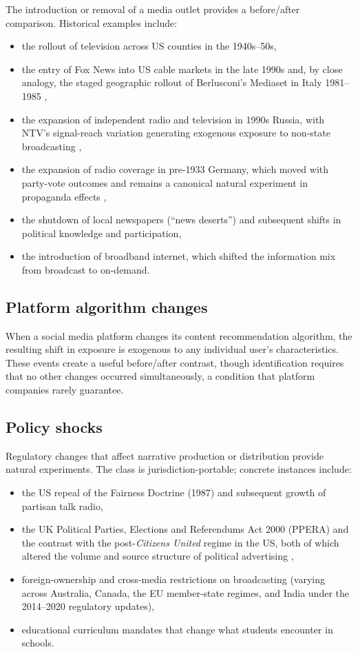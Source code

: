 The introduction or removal of a media outlet provides a before/after comparison.
Historical examples include:
\begin{itemize}[nosep]
  \item the rollout of television across US counties in the 1940s--50s,
  \item the entry of Fox News into US cable markets in the late 1990s \autocite{dellavigna2007} and, by close analogy, the staged geographic rollout of Berlusconi's Mediaset in Italy 1981--1985 \autocite{durante2019},
  \item the expansion of independent radio and television in 1990s Russia, with NTV's signal-reach variation generating exogenous exposure to non-state broadcasting \autocite{enikolopov2011},
  \item the expansion of radio coverage in pre-1933 Germany, which moved with party-vote outcomes and remains a canonical natural experiment in propaganda effects \autocite{adena2015},
  \item the shutdown of local newspapers (``news deserts'') and subsequent shifts in political knowledge and participation,
  \item the introduction of broadband internet, which shifted the information mix from broadcast to on-demand.
\end{itemize}

\subsection{Platform algorithm changes}

When a social media platform changes its content recommendation algorithm, the resulting shift in exposure is exogenous to any individual user's characteristics.
These events create a useful before/after contrast, though identification requires that no other changes occurred simultaneously, a condition that platform companies rarely guarantee.

\subsection{Policy shocks}

Regulatory changes that affect narrative production or distribution provide natural experiments. The class is jurisdiction-portable; concrete instances include:
\begin{itemize}[nosep]
  \item the US repeal of the Fairness Doctrine (1987) and subsequent growth of partisan talk radio,
  \item the UK Political Parties, Elections and Referendums Act 2000 (PPERA) and the contrast with the post-\emph{Citizens United} regime in the US, both of which altered the volume and source structure of political advertising \autocite{ewing2017},
  \item foreign-ownership and cross-media restrictions on broadcasting (varying across Australia, Canada, the EU member-state regimes, and India under the 2014--2020 regulatory updates),
  \item educational curriculum mandates that change what students encounter in schools.
\end{itemize}

